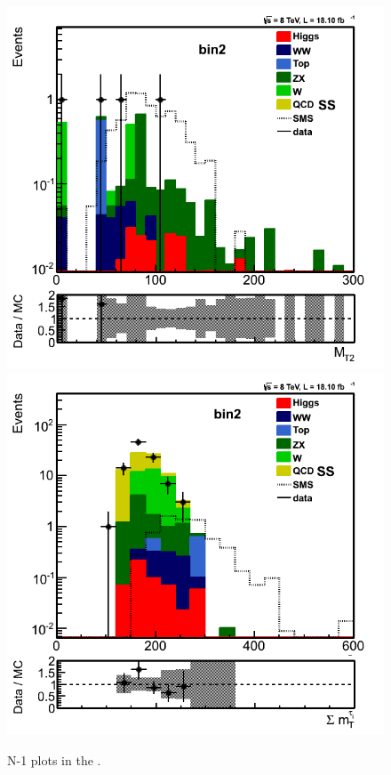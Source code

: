 \begin{figure}[!Hhtb]
\includegraphics[angle=0,scale=0.35]{TauTauFigs/MT2_bin2_14nov.png} 
\includegraphics[angle=0,scale=0.35]{TauTauFigs/summt_bin2_15nov.png}
\caption{N-1 plots in the \bintwo.}
\label{fig:bin2}
\end{figure}






